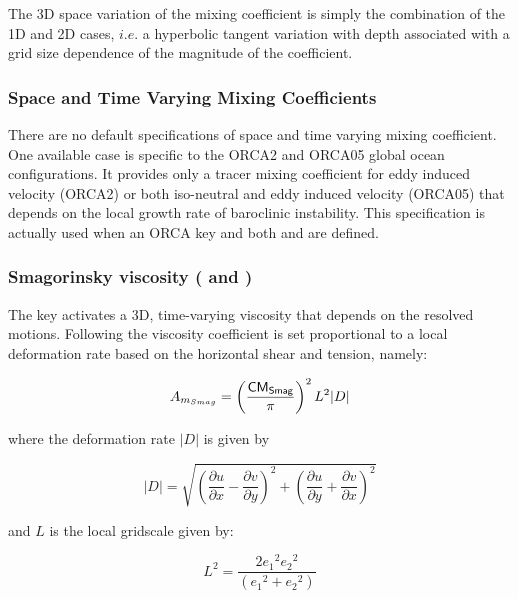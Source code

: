 \documentclass[NEMO_book]{subfiles}
\begin{document}
The 3D space variation of the mixing coefficient is simply the combination of the 
1D and 2D cases, $i.e.$ a hyperbolic tangent variation with depth associated with 
a grid size dependence of the magnitude of the coefficient. 

\subsubsection{Space and Time Varying Mixing Coefficients}

There are no default specifications of space and time varying mixing coefficient.  One
available case is specific to the ORCA2 and ORCA05 global ocean configurations. It
provides only a tracer mixing coefficient for eddy induced velocity (ORCA2) or both
iso-neutral and eddy induced velocity (ORCA05) that depends on the local growth rate of
baroclinic instability. This specification is actually used when an ORCA key
and both  and  are defined.

\subsubsection{Smagorinsky viscosity ( and )}

The  key activates a 3D, time-varying viscosity that depends on the
resolved motions. Following \citep{Smagorinsky_93} the viscosity coefficient is set
proportional to a local deformation rate based on the horizontal shear and tension,
namely:

\begin{equation}
A_{m_{Smag}} = \left(\frac{{\sf CM_{Smag}}}{\pi}\right)^2L^2\vert{D}\vert
\end{equation}

\noindent where the deformation rate $\vert{D}\vert$ is given by 

\begin{equation}
\vert{D}\vert=\sqrt{\left({\frac{\partial{u}} {\partial{x}}}
                         -{\frac{\partial{v}} {\partial{y}}}\right)^2
                 +  \left({\frac{\partial{u}} {\partial{y}}}
                         +{\frac{\partial{v}} {\partial{x}}}\right)^2} 
\end{equation}

\noindent and $L$ is the local gridscale given by:

\begin{equation}
L^2 = \frac{2{e_1}^2 {e_2}^2}{\left ( {e_1}^2 + {e_2}^2 \right )}
\end{equation}
\end{document}
